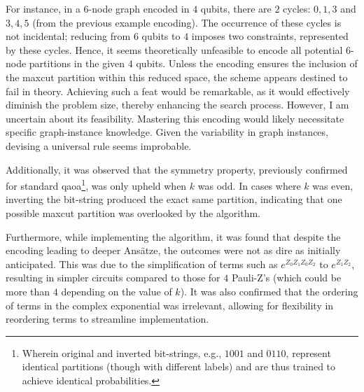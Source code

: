 For instance, in a $6$-node graph encoded in $4$ qubits, there are $2$ cycles: $0, 1, 3$ and $3, 4, 5$ (from the previous example encoding). The occurrence of these cycles is not incidental; reducing from $6$ qubits to $4$ imposes two constraints, represented by these cycles. Hence, it seems theoretically unfeasible to encode all potential $6$-node partitions in the given $4$ qubits. Unless the encoding ensures the inclusion of the \acrshort{maxcut} partition within this reduced space, the scheme appears destined to fail in theory. Achieving such a feat would be remarkable, as it would effectively diminish the problem size, thereby enhancing the search process. However, I am uncertain about its feasibility. Mastering this encoding would likely necessitate specific graph-instance knowledge. Given the variability in graph instances, devising a universal rule seems improbable.

Additionally, it was observed that the symmetry property, previously confirmed for standard \acrshort{qaoa}\footnote{Wherein original and inverted bit-strings, e.g., $1001$ and $0110$, represent identical partitions (though with different labels) and are thus trained to achieve identical probabilities.}, was only upheld when $k$ was odd. In cases where $k$ was even, inverting the bit-string produced the exact same partition, indicating that one possible \acrshort{maxcut} partition was overlooked by the algorithm.

Furthermore, while implementing the algorithm, it was found that despite the encoding leading to deeper Ansätze, the outcomes were not as dire as initially anticipated. This was due to the simplification of terms such as $e^{Z_0Z_1Z_0Z_2}$ to $e^{Z_1Z_2}$, resulting in simpler circuits compared to those for $4$ Pauli-Z's (which could be more than $4$ depending on the value of $k$). It was also confirmed that the ordering of terms in the complex exponential was irrelevant, allowing for flexibility in reordering terms to streamline implementation.

